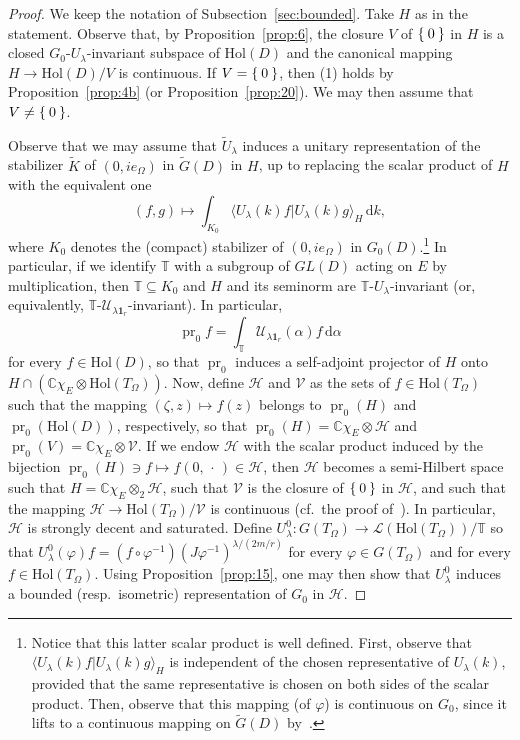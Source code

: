 \documentclass[10.5pt,reqno]{amsart}
\DeclareMathOperator{\pr}{pr}
\newcommand{\Hol}{\mathrm{Hol}}
\newcommand{\vect}[1]{\mathbf{{#1}}}
\newcommand{\dd}{\mathrm{d}}
\newcommand{\C}{\mathds{C}}
\newcommand{\T}{\mathds{T}}
\newcommand{\Hc}{\mathcal{H}}
\newcommand{\Uc}{\mathcal{U}}
\newcommand{\Vc}{\mathcal{V}}
\renewcommand{\phi}{\varphi}
\newcommand{\Lin}{\mathscr{L}}
\begin{document}
\begin{proof}
	We keep the notation of Subsection~\ref{sec:bounded}.
	Take $H$ as in the statement. Observe that, by Proposition~\ref{prop:6}, the closure $V$ of $\Set{0}$ in $H$ is a closed $G_0$-$U_\lambda$-invariant subspace of $\Hol(D)$ and the canonical mapping $H\to \Hol(D)/V$ is continuous. If $V=\Set{0}$, then (1) holds by Proposition~\ref{prop:4b} (or Proposition~\ref{prop:20}). We may then assume that $V\neq \Set{0}$.
	
	Observe that we may assume that $\widetilde U_\lambda$ induces a unitary representation of the stabilizer $\widetilde K$ of $(0, i e_\Omega)$ in $\widetilde G(D)$  in $H$, up to replacing the scalar product of $H$ with the equivalent one
	\[
	(f,g)\mapsto \int_{K_0} \langle U_\lambda(k)f\vert U_\lambda(k) g\rangle_H\,\dd k,
	\]
	where $K_0$ denotes the (compact) stabilizer of $(0,i e_\Omega)$ in $G_0(D)$.\footnote{Notice that this latter scalar product is well defined. First, observe that $\langle U_\lambda(k)f\vert U_\lambda(k) g\rangle_H$ is independent of the chosen representative of $U_\lambda(k)$, provided that the same representative is chosen on both sides of the scalar product. Then, observe that this mapping (of $\phi$) is continuous on $G_0$, since it lifts to a continuous mapping on $\widetilde G(D)$ by~\cite[Proposition 2.14]{Rango1}. } In particular, if we identify  $\T$ with a subgroup of $GL(D)$ acting  on $E$ by multiplication, then $\T\subseteq K_0$ and $H$ and its seminorm are $\T$-$U_\lambda$-invariant (or, equivalently, $\T$-$\Uc_{\lambda \vect 1_r}$-invariant). In particular,
	\[
	\pr_0 f=\int_\T \Uc_{\lambda \vect 1_r}(\alpha)f\,\dd \alpha 
	\]
	for every $f\in \Hol(D)$, so that $\pr_0$ induces a self-adjoint projector of $H$ onto $H\cap (\C \chi_E\otimes \Hol(T_\Omega))$. 
	Now, define $\Hc$ and $\Vc$ as the sets of $f\in \Hol(T_\Omega)$ such that the mapping $(\zeta,z)\mapsto f(z)$ belongs to  $\pr_0(H)$ and  $\pr_0(\Hol(D))$, respectively, so that $\pr_0(H)=\C\chi_E\otimes \Hc$ and $\pr_0(V)=\C \chi_E\otimes \Vc$. If we endow $\Hc$ with the scalar product induced by the bijection $\pr_0(H)\ni f\mapsto f(0,\,\cdot\,)\in \Hc$, then $\Hc$ becomes a semi-Hilbert space such that $H=\C\chi_E\otimes_2 \Hc$, such that $\Vc$ is the closure of $\Set{0}$ in $\Hc$, and such that the mapping $\Hc\to \Hol(T_\Omega)/\Vc$ is continuous (cf.~the proof of~\cite[Proposition 5.1]{Rango1}). In particular, $\Hc$ is strongly decent and saturated.
	Define $U^0_\lambda\colon G(T_\Omega)\to \Lin(\Hol(T_\Omega))/\T$   so that $U^0_\lambda(\phi) f=(f\circ \phi^{-1}) (J\phi^{-1})^{\lambda/(2 m/r)}$ for every $\phi\in G(T_\Omega)$ and for every $f\in \Hol(T_\Omega)$.
	Using Proposition~\ref{prop:15}, one may then show that $U^0_\lambda$ induces a bounded (resp.\ isometric) representation of $G_0$ in $\Hc$.
	

\end{proof}
\end{document}
